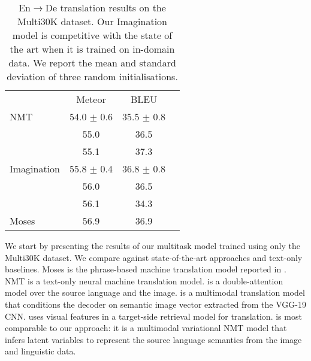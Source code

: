 
\begin{table}
\centering
\renewcommand{\arraystretch}{1.3}
\begin{tabular}{lccc}
\cmidrule[0.08em](l{5pt}r{5pt}){1-3}
& Meteor & BLEU \\
\cmidrule(l{5pt}r{5pt}){1-3}
NMT & 54.0 $\pm$ 0.6 & 35.5 $\pm$ 0.8\\
\citep{Calixto2017c} & 55.0 & 36.5 \\
\citep{Calixto2017b} & 55.1 & 37.3 \\
Imagination & 55.8 $\pm$ 0.4 & 36.8 $\pm$ 0.8\\
\citep{toyama2016neural} & 56.0  & 36.5 \\
\citep{Hitschler2016} & 56.1 & 34.3 \\
Moses & 56.9 & 36.9\\
\cmidrule[0.08em](l{5pt}r{5pt}){1-3}
\end{tabular}
\caption{En$\rightarrow$De translation results on the Multi30K dataset. Our Imagination model is competitive with the state of the art when it is trained on in-domain data. We report the mean and standard deviation of three random initialisations.}
\label{tab:results:in-domain}
\end{table}

We start by presenting the results of our multitask
model trained using only the Multi30K dataset. We compare against state-of-the-art approaches and text-only baselines. Moses is the phrase-based machine translation model \cite{Koehn2007} reported in \cite{Specia2016}. NMT is a text-only neural machine translation model.
\citep{Calixto2017c} is a double-attention model over the source language and the image.
\citep{Calixto2017b} is a multimodal translation model that conditions the decoder on semantic image vector extracted from the VGG-19 CNN.
\citep{Hitschler2016} uses visual features in a target-side retrieval model for translation. \citep{toyama2016neural} is most comparable to our approach: it is a multimodal variational NMT model that infers latent variables to represent the source language semantics from the image and linguistic data.


